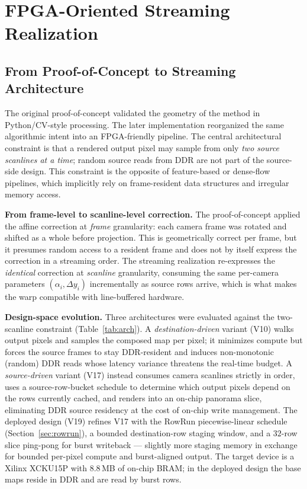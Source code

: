 \documentclass[journal]{IEEEtran}
\begin{document}
\section{FPGA-Oriented Streaming Realization}
\label{sec:fpga}
\subsection{From Proof-of-Concept to Streaming Architecture}
The original proof-of-concept validated the geometry of the method in Python/CV-style processing. The later implementation reorganized the same algorithmic intent into an FPGA-friendly pipeline. The central architectural constraint is that a rendered output pixel may sample from only \emph{two source scanlines at a time}; random source reads from DDR are not part of the source-side design. This constraint is the opposite of feature-based or dense-flow pipelines, which implicitly rely on frame-resident data structures and irregular memory access.

\textbf{From frame-level to scanline-level correction.} The proof-of-concept applied the affine correction at \emph{frame} granularity: each camera frame was rotated and shifted as a whole before projection. This is geometrically correct per frame, but it presumes random access to a resident frame and does not by itself express the correction in a streaming order. The streaming realization re-expresses the \emph{identical} correction at \emph{scanline} granularity, consuming the same per-camera parameters $(\alpha_i,\Delta y_i)$ incrementally as source rows arrive, which is what makes the warp compatible with line-buffered hardware.

\textbf{Design-space evolution.} Three architectures were evaluated against the two-scanline constraint (Table~\ref{tab:arch}). A \emph{destination-driven} variant (V10) walks output pixels and samples the composed map per pixel; it minimizes compute but forces the source frames to stay DDR-resident and induces non-monotonic (random) DDR reads whose latency variance threatens the real-time budget. A \emph{source-driven} variant (V17) instead consumes camera scanlines strictly in order, uses a source-row-bucket schedule to determine which output pixels depend on the rows currently cached, and renders into an on-chip panorama slice, eliminating DDR source residency at the cost of on-chip write management. The deployed design (V19) refines V17 with the RowRun piecewise-linear schedule (Section~\ref{sec:rowrun}), a bounded destination-row staging window, and a $32$-row slice ping-pong for burst writeback --- slightly more staging memory in exchange for bounded per-pixel compute and burst-aligned output. The target device is a Xilinx XCKU15P with $8.8$\,MB of on-chip BRAM; in the deployed design the base maps reside in DDR and are read by burst rows.
\end{document}
